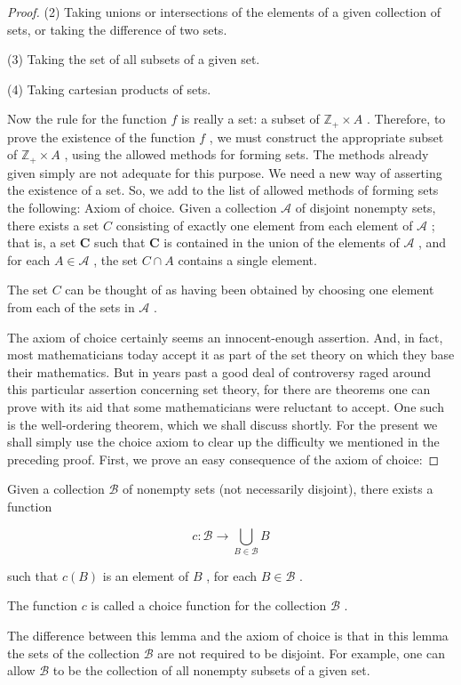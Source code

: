\begin{proof}
(2) Taking unions or intersections of the elements of a given collection of sets, or taking the difference of two sets.

(3) Taking the set of all subsets of a given set.

(4) Taking cartesian products of sets.

Now the rule for the function \(f\) is really a set: a subset of \({\mathbb{Z}}_{ + } \times  A\) . Therefore, to prove the existence of the function \(f\) , we must construct the appropriate subset of \({\mathbb{Z}}_{ + } \times  A\) , using the allowed methods for forming sets. The methods already given simply are not adequate for this purpose. We need a new way of asserting the existence of a set. So, we add to the list of allowed methods of forming sets the following: Axiom of choice. Given a collection \(\mathcal{A}\) of disjoint nonempty sets, there exists a set \(C\) consisting of exactly one element from each element of \(\mathcal{A}\) ; that is, a set \(\mathbf{C}\) such that \(\mathbf{C}\) is contained in the union of the elements of \(\mathcal{A}\) , and for each \(A \in  \mathcal{A}\) , the set \(C \cap  A\) contains a single element.

The set \(C\) can be thought of as having been obtained by choosing one element from each of the sets in \(\mathcal{A}\) .

The axiom of choice certainly seems an innocent-enough assertion. And, in fact, most mathematicians today accept it as part of the set theory on which they base their mathematics. But in years past a good deal of controversy raged around this particular assertion concerning set theory, for there are theorems one can prove with its aid that some mathematicians were reluctant to accept. One such is the well-ordering theorem, which we shall discuss shortly. For the present we shall simply use the choice axiom to clear up the difficulty we mentioned in the preceding proof. First, we prove an easy consequence of the axiom of choice:
\end{proof}
\begin{lemma} Given a collection \(\mathcal{B}\) of nonempty sets (not necessarily disjoint), there exists a function

\[
c : \mathcal{B} \rightarrow  \mathop{\bigcup }\limits_{{B \in  \mathcal{B}}}B
\]

such that \(c\left( B\right)\) is an element of \(B\) , for each \(B \in  \mathcal{B}\) .

The function \(c\) is called a choice function for the collection \(\mathcal{B}\) .

The difference between this lemma and the axiom of choice is that in this lemma the sets of the collection \(\mathcal{B}\) are not required to be disjoint. For example, one can allow \(\mathcal{B}\) to be the collection of all nonempty subsets of a given set.
\end{lemma}

